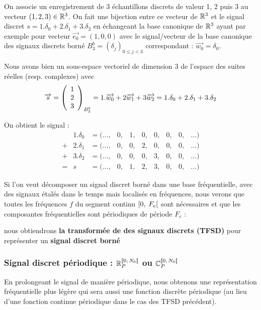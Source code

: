 \begin{exemple}
  On associe un enregistrement de 3 échantillons discrets de valeur 1,
  2 puis 3 au vecteur $(1, 2, 3)\in\mathbb{R}^3$. On fait une bijection entre
  ce vecteur de $\mathbb{R}^3$ et le signal discret
  $s=1.\delta_0+2.\delta_1+3.\delta_2$ en échangeant la base canonique
  de $\mathbb{R}^3$ ayant par exemple pour vecteur $\vec{e_0}=(1,0,0)$ avec le
  signal/vecteur de la base canonique des signaux discrets borné
  $B_3^b=\left(\delta_j\right)_{0\leq j<3}$ correspondant :
  $\vec{w_0} = \delta_0$.

  Nous avons bien un sous-espace vectoriel de dimension 3 de l'espace
  des suites réelles (resp. complexes) avec
  $$\overrightarrow{s} = \left(\begin{array}{c} {1} \\ {2} \\ {3} \end{array}\right)_{B_3^b} = 1.\overrightarrow{w_0}+2\overrightarrow{w_1}+3\overrightarrow{w_2} = 1.\delta_0+2.\delta_1+3.\delta_2$$

   On obtient le signal :
  $$
  \begin{array}{llcccccccc}
     &1.\delta_0 & =(\ldots, &0 , &1, &0, &0, &0, &0, &\ldots)\\
    +&2.\delta_1 & =(\ldots, &0 , &0, &2, &0, &0, &0, &\ldots)\\
    +&3.\delta_2 & =(\ldots, &0 , &0, &0, &3, &0, &0, &\ldots)\\\hline
    =& s  & =(\ldots, &0 , &1, &2, &3, &0, &0, &\ldots)
  \end{array}
  $$
\end{exemple}

\begin{remarque}
  Si l'on veut décomposer un signal discret borné dans une base fréquentielle, avec des signaux étalés dans le temps mais localisés en fréquences, nous verons que toutes les fréquences $f$ du segment continu $\left[0,\;F_e\right[$ sont nécessaires et que les composantes fréquentielles sont périodiques de période $F_e$ :

nous obtiendrons \textbf{la transformée de \Fourier{} des signaux discrets (TFSD)} pour représenter un \textbf{signal discret borné}
\end{remarque}


\subsubsection{Signal discret périodique : $\RNper$ ou $\CNper$}
En prolongeant le signal de manière périodique, nous obtenons une
représentation fréquentielle plus légère qui sera aussi une fonction
discrète périodique (au lieu d'une fonction continue périodique dans
le cas des TFSD précédent).

